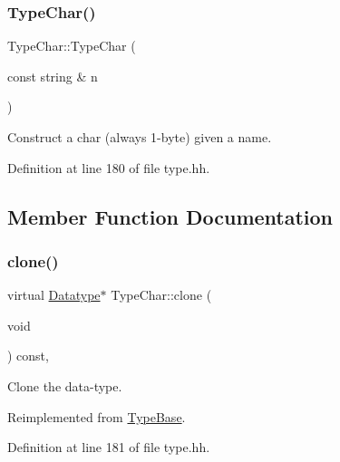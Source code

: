 \subsubsection{\texorpdfstring{TypeChar()}{TypeChar()}\hspace{0.1cm}{\footnotesize\ttfamily [2/2]}}
{\footnotesize\ttfamily Type\+Char\+::\+Type\+Char (\begin{DoxyParamCaption}\item[{const string \&}]{n }\end{DoxyParamCaption})\hspace{0.3cm}{\ttfamily [inline]}}



Construct a char (always 1-\/byte) given a name. 



Definition at line 180 of file type.\+hh.



\subsection{Member Function Documentation}
\mbox{\label{class_type_char_af09a0ae04e18990511b4f3bda2141559}} 
\subsubsection{\texorpdfstring{clone()}{clone()}}
{\footnotesize\ttfamily virtual \mbox{\hyperlink{class_datatype}{Datatype}}$\ast$ Type\+Char\+::clone (\begin{DoxyParamCaption}\item[{void}]{ }\end{DoxyParamCaption}) const\hspace{0.3cm}{\ttfamily [inline]}, {\ttfamily [virtual]}}



Clone the data-\/type. 



Reimplemented from \mbox{\hyperlink{class_type_base_ad506116cf9bf5bc6d13654b38609d184}{Type\+Base}}.



Definition at line 181 of file type.\+hh.

